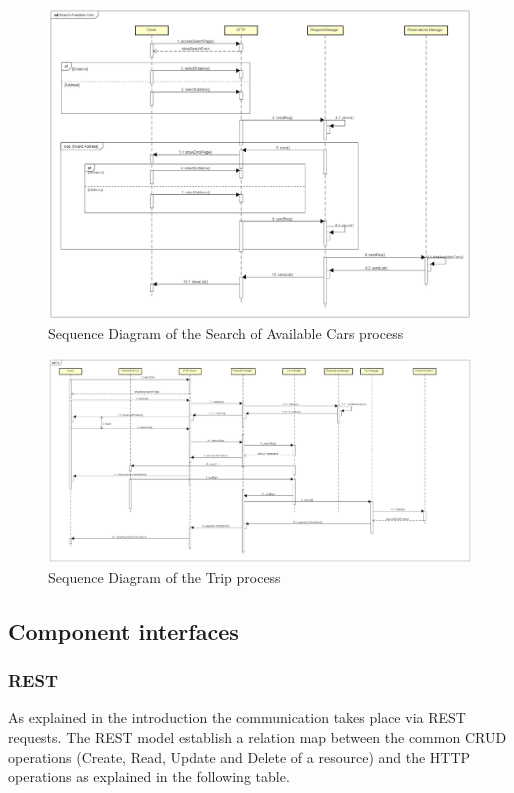 \begin{figure}[H]	
	\centering
	\includegraphics[width=\textwidth]{img/sequence_search}
	\caption{Sequence Diagram of the Search of Available Cars process}
\end{figure}
\newpage


\begin{figure}[H]	
	\centering
	\includegraphics[width=\textwidth]{img/sequence_trip}
	\caption{Sequence Diagram of the Trip process}
\end{figure}
\newpage



\subsection{Component interfaces} 
\subsubsection{REST}
As explained in the introduction the communication takes place via REST requests. The REST model establish a relation map between the common CRUD operations (Create, Read, Update and Delete of a resource) and the HTTP operations as explained in the following table.

